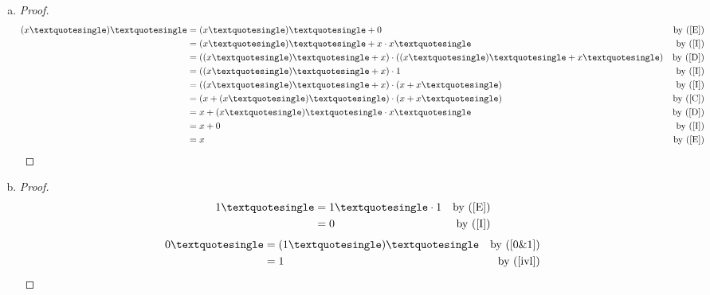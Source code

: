 \begin{enumerate} [(a)]
\begin{proof}
\begin{align*}
				&= x\cdot1 &\text{by (\ref{bdd})}\\
				&= x &\text{by (\ref{E})}
			\end{align*}
			\begin{align*}
				x\cdot(x+y) &= (x+0)\cdot(x+y) &\text{by (\ref{I})}\\
				&= x+0\cdot y &\text{by (\ref{D})}\\
				&= x+0 &\text{by (\ref{bdd})}\\
				&= x &\text{by (\ref{E})}
			\end{align*}
		\end{proof}
		\item \begin{proof} \label{ivl}
			\begin{align*}
				(x\textquotesingle)\textquotesingle &= (x\textquotesingle)\textquotesingle + 0 &\text{by (\ref{E})}\\
				&=(x\textquotesingle)\textquotesingle + x\cdot x\textquotesingle &\text{by (\ref{I})}\\
				&= ((x\textquotesingle)\textquotesingle + x)\cdot((x\textquotesingle)\textquotesingle + x\textquotesingle) &\text{by (\ref{D})}\\
				&= ((x\textquotesingle)\textquotesingle + x)\cdot1 &\text{by (\ref{I})}\\
				&= ((x\textquotesingle)\textquotesingle + x)\cdot(x + x\textquotesingle) &\text{by (\ref{I})}\\
				&= (x+(x\textquotesingle)\textquotesingle)\cdot(x + x\textquotesingle) &\text{by (\ref{C})}\\
				&= x + (x\textquotesingle)\textquotesingle\cdot x\textquotesingle &\text{by (\ref{D})}\\
				&= x + 0 &\text{by (\ref{I})}\\
				&= x &\text{by (\ref{E})}
			\end{align*}
		\end{proof}
		\item \begin{proof} \label{0&1}
			\begin{align*}
				1\textquotesingle & = 1\textquotesingle\cdot1 &\text{by (\ref{E})}\\
				&= 0 &\text{by (\ref{I})}
			\end{align*}
			\begin{align*}
				0\textquotesingle & = (1\textquotesingle)\textquotesingle &\text{by (\ref{0&1})}\\
				&= 1 &\text{by (\ref{ivl})}
			\end{align*}

\end{proof}
\end{enumerate}
